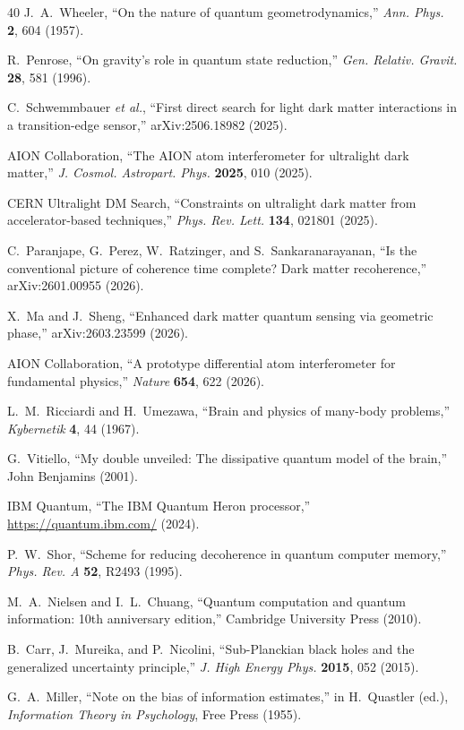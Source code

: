 ﻿\documentclass[12pt,a4paper]{article}
\begin{document}
\begin{thebibliography}{40}
J.~A.~Wheeler,
``On the nature of quantum geometrodynamics,''
\textit{Ann. Phys.} \textbf{2}, 604 (1957).

R.~Penrose,
``On gravity's role in quantum state reduction,''
\textit{Gen. Relativ. Gravit.} \textbf{28}, 581 (1996).

C.~Schwemmbauer \textit{et al.},
``First direct search for light dark matter interactions in a transition-edge sensor,''
arXiv:2506.18982 (2025).

AION Collaboration,
``The AION atom interferometer for ultralight dark matter,''
\textit{J. Cosmol. Astropart. Phys.} \textbf{2025}, 010 (2025).

CERN Ultralight DM Search,
``Constraints on ultralight dark matter from accelerator-based techniques,''
\textit{Phys. Rev. Lett.} \textbf{134}, 021801 (2025).

C.~Paranjape, G.~Perez, W.~Ratzinger, and S.~Sankaranarayanan,
``Is the conventional picture of coherence time complete? Dark matter recoherence,''
arXiv:2601.00955 (2026).

X.~Ma and J.~Sheng,
``Enhanced dark matter quantum sensing via geometric phase,''
arXiv:2603.23599 (2026).

AION Collaboration,
``A prototype differential atom interferometer for fundamental physics,''
\textit{Nature} \textbf{654}, 622 (2026).

L.~M.~Ricciardi and H.~Umezawa,
``Brain and physics of many-body problems,''
\textit{Kybernetik} \textbf{4}, 44 (1967).

G.~Vitiello,
``My double unveiled: The dissipative quantum model of the brain,''
John Benjamins (2001).

IBM Quantum,
``The IBM Quantum Heron processor,''
\url{https://quantum.ibm.com/} (2024).

P.~W.~Shor,
``Scheme for reducing decoherence in quantum computer memory,''
\textit{Phys. Rev. A} \textbf{52}, R2493 (1995).

M.~A.~Nielsen and I.~L.~Chuang,
``Quantum computation and quantum information: 10th anniversary edition,''
Cambridge University Press (2010).

B.~Carr, J.~Mureika, and P.~Nicolini,
``Sub-Planckian black holes and the generalized uncertainty principle,''
\textit{J. High Energy Phys.} \textbf{2015}, 052 (2015).

G.~A.~Miller,
``Note on the bias of information estimates,''
in H.~Quastler (ed.), \textit{Information Theory in Psychology}, Free Press (1955).

\end{thebibliography}
\end{document}
